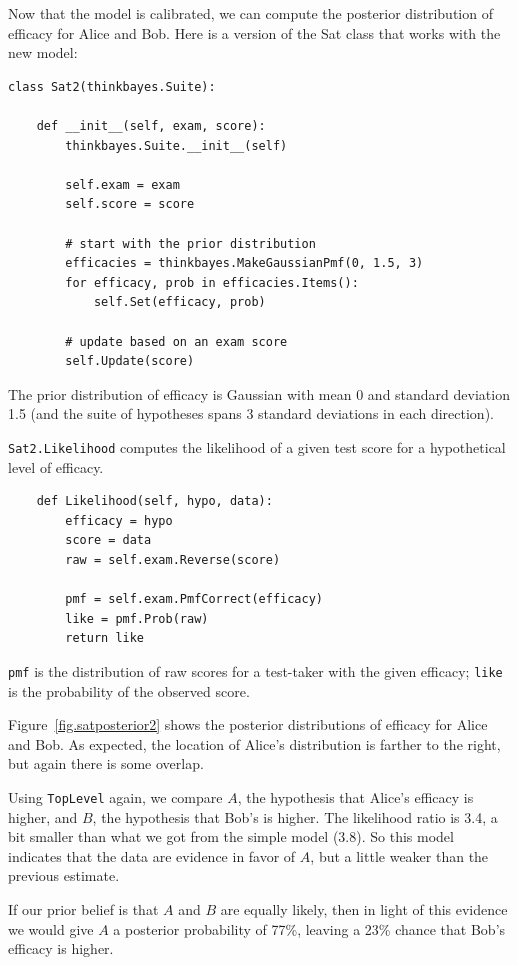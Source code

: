 \documentclass[12pt]{book}
\begin{document}
Now that the model is calibrated, we can compute the posterior
distribution of efficacy for Alice and Bob.  Here is a version of the
Sat class that works with the new model:

\begin{verbatim}
class Sat2(thinkbayes.Suite):

    def __init__(self, exam, score):
        thinkbayes.Suite.__init__(self)

        self.exam = exam
        self.score = score

        # start with the prior distribution
        efficacies = thinkbayes.MakeGaussianPmf(0, 1.5, 3)
        for efficacy, prob in efficacies.Items():
            self.Set(efficacy, prob)

        # update based on an exam score
        self.Update(score)
\end{verbatim}

The prior distribution of efficacy is
Gaussian with mean 0 and standard deviation 1.5 (and the suite of
hypotheses spans 3 standard deviations in each direction).

\verb"Sat2.Likelihood" computes the likelihood of a given test score
for a hypothetical level of efficacy.

\begin{verbatim}
    def Likelihood(self, hypo, data):
        efficacy = hypo
        score = data
        raw = self.exam.Reverse(score)

        pmf = self.exam.PmfCorrect(efficacy)
        like = pmf.Prob(raw)
        return like
\end{verbatim}

{\tt pmf} is the distribution of raw scores for a test-taker
with the given efficacy; {\tt like} is the probability of
the observed score.

Figure~\ref{fig.satposterior2} shows the posterior distributions
of efficacy for Alice and Bob.  As expected, the location
of Alice's distribution is farther to the right, but again there
is some overlap.

Using {\tt TopLevel} again, we compare $A$, the
hypothesis that Alice's efficacy is higher, and $B$, the
hypothesis that Bob's is higher.  The likelihood ratio is
3.4, a bit smaller than what we got from the simple model (3.8).
So this model indicates that the data are evidence in favor
of $A$, but a little weaker than the previous estimate.

If our prior belief is that $A$ and $B$ are equally likely,
then in light of this evidence we would give $A$ a posterior
probability of 77\%, leaving a 23\% chance that Bob's efficacy
is higher.
\end{document}
